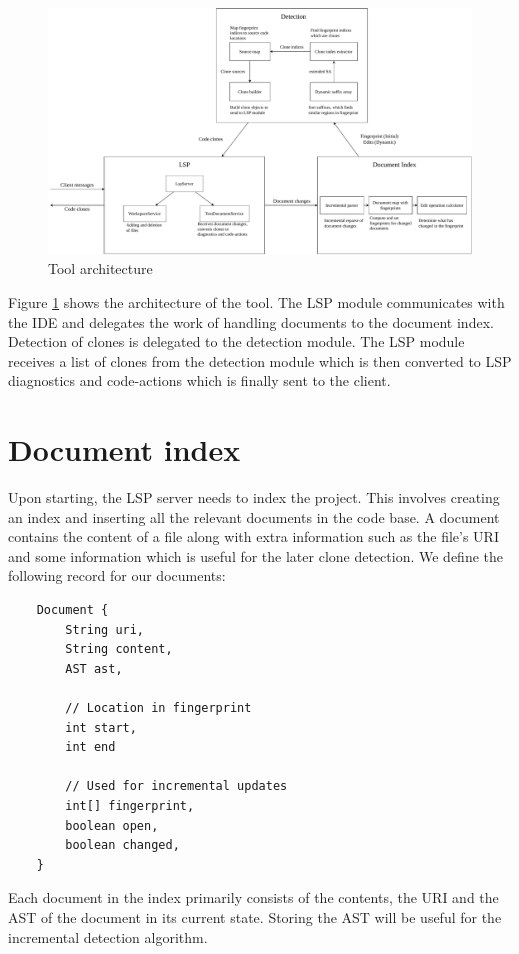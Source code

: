 \begin{figure}
	\includegraphics[width=\textwidth]{figures/architecture.drawio.pdf}
	\caption{Tool architecture}
	\label{fig:architecture}
\end{figure}

Figure \ref{fig:architecture} shows the architecture of the tool. The LSP module
communicates with the IDE and delegates the work of handling documents to the document
index. Detection of clones is delegated to the detection module. The LSP module receives a
list of clones from the detection module which is then converted to LSP diagnostics and
code-actions which is finally sent to the client.

\section{Document index}

Upon starting, the LSP server needs to index the project. This involves creating an index
and inserting all the relevant documents in the code base. A document contains the content
of a file along with extra information such as the file's URI and some information which
is useful for the later clone detection. We define the following record for our documents:

\begin{lstlisting}
    Document {
        String uri,
        String content,
        AST ast,

        // Location in fingerprint
        int start,
        int end

        // Used for incremental updates
        int[] fingerprint,
        boolean open,
        boolean changed,
    }
\end{lstlisting}

Each document in the index primarily consists of the contents, the URI and the AST of the
document in its current state. Storing the AST will be useful for the incremental
detection algorithm.

